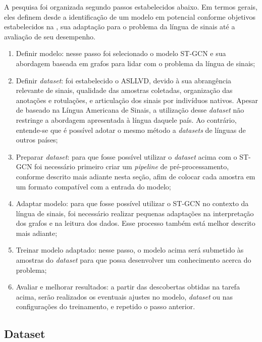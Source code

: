 A pesquisa foi organizada segundo passos estabelecidos abaixo. Em termos gerais, eles definem desde a identificação de um modelo em potencial conforme objetivos estabelecidos na , sua adaptação para o problema da língua de sinais até a avaliação de seu desempenho.

\begin{enumerate}
    \item Definir modelo: nesse passo foi selecionado o modelo ST-GCN e sua abordagem baseada em grafos para lidar com o problema da língua de sinais;
    \item Definir \textit{dataset}: foi estabelecido o ASLLVD, devido à sua abrangência relevante de sinais, qualidade das amostras coletadas, organização das anotações e rotulações, e articulação dos sinais por indivíduos nativos. Apesar de baseado na Língua Americana de Sinais, a utilização desse \textit{dataset} não restringe a abordagem apresentada à língua daquele país. Ao contrário, entende-se que é possível adotar o mesmo método a \textit{datasets} de línguas de outros países;
    \item Preparar \textit{dataset}: para que fosse possível utilizar o \textit{dataset} acima com o ST-GCN foi necessário primeiro criar um \textit{pipeline} de pré-processamento, conforme descrito mais adiante nesta seção, afim de colocar cada amostra em  um formato compatível com a entrada do modelo;
    \item Adaptar modelo: para que fosse possível utilizar o ST-GCN no contexto da língua de sinais, foi necessário realizar pequenas adaptações na interpretação dos grafos e na leitura dos dados. Esse processo também está melhor descrito mais adiante;
    \item Treinar modelo adaptado: nesse passo, o modelo acima será submetido às amostras do \textit{dataset} para que possa desenvolver um conhecimento acerca do problema;
    \item Avaliar e melhorar resultados: a partir das descobertas obtidas na tarefa acima, serão realizados os eventuais ajustes no modelo, \textit{dataset} ou nas configurações do treinamento, e repetido o passo anterior.
\end{enumerate}


\subsection{Dataset} %

